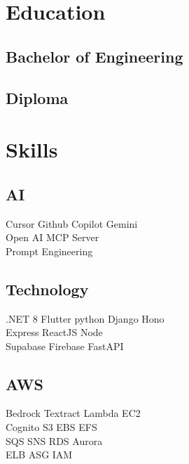 \documentclass[]{deedy-resume-reversed}
\begin{document}
\begin{minipage}[t]{0.33\textwidth}

\section{Education}

\subsection{Bachelor of Engineering}
\sectionsep

\subsection{Diploma}
\sectionsep

\section{Skills}

\subsection{AI}
Cursor \textbullet Github Copilot \textbullet Gemini\\
Open AI \textbullet MCP Server \\
Prompt Engineering 
\sectionsep

\subsection{Technology}
.NET 8 \textbullet Flutter \textbullet python \textbullet Django \textbullet Hono \\ 
\textbullet Express \textbullet ReactJS \textbullet  Node \\
Supabase \textbullet Firebase \textbullet FastAPI \\
\sectionsep

\subsection{AWS}
Bedrock \textbullet Textract \textbullet Lambda \textbullet EC2 \\
Cognito \textbullet S3 \textbullet EBS \textbullet EFS \\
SQS \textbullet SNS \textbullet RDS \textbullet Aurora \\
ELB \textbullet ASG \textbullet IAM
\sectionsep


\end{minipage}
\end{document}
